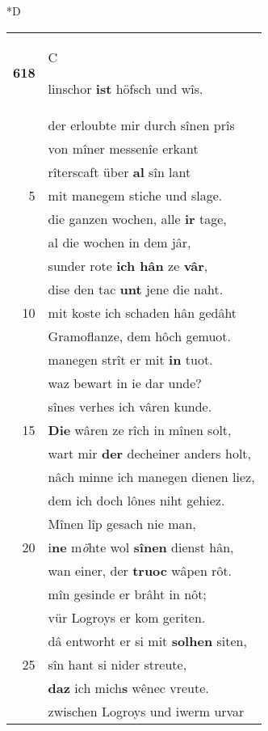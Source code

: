 \documentclass[8pt,a4paper,notitlepage]{article}
\begin{document}
\begin{table}[ht]
\begin{minipage}[t]{0.5\linewidth}
\small
\begin{center}*D
\end{center}
\begin{tabular}{rl}
\textbf{618} & \begin{large}C\end{large}linschor \textbf{ist} höfsch und wîs.\\ 
 & der erloubte mir durch sînen prîs\\ 
 & von mîner messenîe erkant\\ 
 & rîterscaft über \textbf{al} sîn lant\\ 
5 & mit manegem stiche und slage.\\ 
 & die ganzen wochen, alle \textbf{ir} tage,\\ 
 & al die wochen in dem jâr,\\ 
 & sunder rote \textbf{ich hân} ze \textbf{vâr},\\ 
 & dise den tac \textbf{unt} jene die naht.\\ 
10 & mit koste ich schaden hân gedâht\\ 
 & Gramoflanze, dem hôch gemuot.\\ 
 & manegen strît er mit \textbf{in} tuot.\\ 
 & waz bewart in ie dar unde?\\ 
 & sînes verhes ich vâren kunde.\\ 
15 & \textbf{Die} wâren ze rîch in mînen solt,\\ 
 & wart mir \textbf{der} decheiner anders holt,\\ 
 & nâch minne ich manegen dienen liez,\\ 
 & dem ich doch lônes niht gehiez.\\ 
 & Mînen lîp gesach nie man,\\ 
20 & i\textbf{ne} m\textit{ö}hte wol \textbf{sînen} dienst hân,\\ 
 & wan einer, der \textbf{truoc} wâpen rôt.\\ 
 & mîn gesinde er brâht in nôt;\\ 
 & vür Logroys er kom geriten.\\ 
 & dâ entworht er si mit \textbf{solhen} siten,\\ 
25 & sîn hant si nider streute,\\ 
 & \textbf{daz} ich mich\textbf{s} wênec vreute.\\ 
 & zwischen Logroys und iwerm urvar\\ 

\end{tabular}
\end{minipage}
\end{table}
\end{document}
